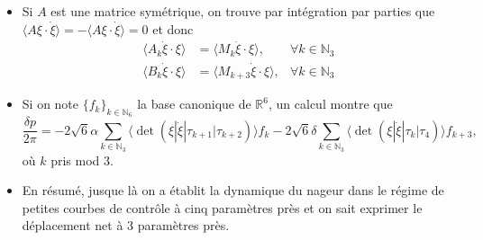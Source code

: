 \documentclass[12pt,a4paper]{article}
\theoremstyle{plain}
\theoremstyle{plain}
\theoremstyle{plain}
\theoremstyle{definition}
\theoremstyle{definition}
\theoremstyle{definition}
\theoremstyle{plain}
\newcommand{\N}{\mathbb{N}}
\newcommand{\R}{\mathbb{R}}
\begin{document}
\begin{itemize}
\item Si $A$ est une matrice symétrique, on trouve par intégration par parties que $\langle A \xi \cdot \dot{\xi} \rangle = - \langle A \xi \cdot \dot{\xi} \rangle = 0$ et donc
\begin{align}
\langle A_k \dot{\xi} \cdot \xi \rangle &= \langle M_k \dot{\xi} \cdot \xi \rangle, &\forall k \in \N_3\\
\langle B_k \dot{\xi} \cdot \xi \rangle &= \langle M_{k + 3} \dot{\xi} \cdot \xi \rangle, &\forall k \in \N_3
\end{align}

\item Si on note $\{f_k\}_{k \in \N_6}$ la base canonique de $\R^6$, un calcul montre que
\begin{equation}
\label{eq: net displacement}
\frac{\delta p}{2 \pi}= - 2  \sqrt{6} \alpha \sum_{k \in \N_3}\langle \det( \xi | \dot{\xi} | \tau_{k+1} | \tau_{k+2})\rangle f_k  - 2  \sqrt{6} \delta \sum_{k \in \N_3}\langle \det ( \xi | \dot{\xi} | \tau_{k} | \tau_{4})\rangle f_{k + 3},
\end{equation}
où $k$ pris mod 3.

\item En résumé, jusque là on a établit la dynamique du nageur dans le régime de petites courbes de contrôle à cinq paramètres près et on sait exprimer le déplacement net à 3 paramètres près.
\end{itemize}
\end{document}
